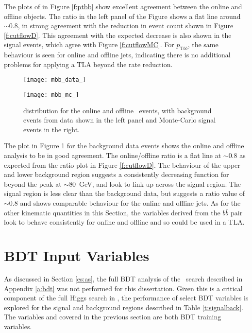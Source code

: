         The plots of \ptbb in Figure \ref{f:ptbb} show excellent agreement between the online and offline objects. The ratio in the left panel of the Figure shows a flat line around $\sim0.8$, in strong agreement with the reduction in event count shown in Figure \ref{f:cutflowD}. This agreement with the expected decrease is also shown in the signal events, which agree with Figure \ref{f:cutflowMC}. For $p_{\text{T}bb}$, the same behaviour is seen for online and offline jets, indicating there is no additional problems for applying a TLA beyond the rate reduction.

        \begin{figure}[h]
            \centering
            \begin{minipage}[h]{0.48\linewidth}
                \texttt{[image: mbb\_data\_]}
            \end{minipage}
            \quad
            \begin{minipage}[h]{0.48\linewidth}
                \texttt{[image: mbb\_mc\_]}
            \end{minipage}
            \caption[Comparison of the \mbb distribution of the \VBFHBB\ events for HLT and offline objects]{\mbb distribution for the online and offline \VBFHBB\ events, with background events from data shown in the left panel and Monte-Carlo signal events in the right.}
            \label{f:mbb}
        \end{figure}

        The \mbb plot in Figure \ref{f:mbb} for the background data events shows the online and offline analysis to be in good agreement. The online/offline ratio is a flat line at $\sim0.8$ as expected from the ratio plot in Figure \ref{f:cutflowD}. The behaviour of the upper and lower background region suggests a consistently decreasing function for \mbb beyond the peak at \pt$\sim80$~GeV, and look to link up across the signal region. The signal region is less clear than the background data, but suggests a ratio value of $\sim0.8$ and shows comparable behaviour for the online and offline jets. As for the other kinematic quantities in this Section, the variables derived from the $b\bar{b}$ pair look to behave consistently for online and offline and so could be used in a TLA.
\section{BDT Input Variables}

    As discussed in Section \ref{es:as}, the full BDT analysis of the \VBFHBB\ search described in Appendix \ref{a:bdt} was not performed for this dissertation. Given this is a critical component of the full Higgs search \cite{VBFHbb8tev} in \VBFHBB, the performance of select BDT variables is explored for the signal and background regions described in Table \ref{t:signalback}. The variables \mjj and \ptjj covered in the previous section are both BDT training variables.

